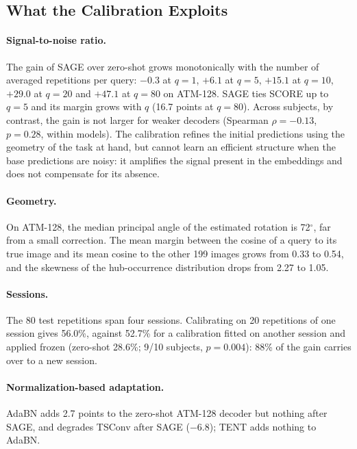 \documentclass[10pt,twocolumn,letterpaper]{article}
\begin{document}
\subsection{What the Calibration Exploits}
\label{sec:analysis}

\paragraph{Signal-to-noise ratio.}
The gain of SAGE over zero-shot grows monotonically with the number of averaged repetitions per query: $-0.3$ at $q=1$, $+6.1$ at $q=5$, $+15.1$ at $q=10$, $+29.0$ at $q=20$ and $+47.1$ at $q=80$ on ATM-128. SAGE ties SCORE up to $q=5$ and its margin grows with $q$ (16.7 points at $q=80$). Across subjects, by contrast, the gain is not larger for weaker decoders (Spearman $\rho=-0.13$, $p=0.28$, within models). The calibration refines the initial predictions using the geometry of the task at hand, but cannot learn an efficient structure when the base predictions are noisy: it amplifies the signal present in the embeddings and does not compensate for its absence.

\paragraph{Geometry.}
On ATM-128, the median principal angle of the estimated rotation is 72$^\circ$, far from a small correction. The mean margin between the cosine of a query to its true image and its mean cosine to the other 199 images grows from 0.33 to 0.54, and the skewness of the hub-occurrence distribution drops from 2.27 to 1.05.

\paragraph{Sessions.}
The 80 test repetitions span four sessions. Calibrating on 20 repetitions of one session gives 56.0\%, against 52.7\% for a calibration fitted on another session and applied frozen (zero-shot 28.6\%; 9/10 subjects, $p=0.004$): 88\% of the gain carries over to a new session.

\paragraph{Normalization-based adaptation.}
AdaBN adds 2.7 points to the zero-shot ATM-128 decoder but nothing after SAGE, and degrades TSConv after SAGE ($-6.8$); TENT adds nothing to AdaBN.
\end{document}
